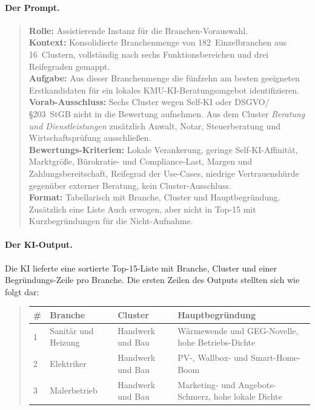 \documentclass[a4paper,11pt]{article}
\begin{document}
\paragraph{Der Prompt.}
\begin{quote}
\textbf{Rolle:} Assistierende Instanz für die Branchen-Vorauswahl.\\
\textbf{Kontext:} Konsolidierte Branchenmenge von 182~Einzelbranchen aus
16~Clustern, vollständig nach sechs Funktionsbereichen und drei
Reifegraden gemappt.\\
\textbf{Aufgabe:} Aus dieser Branchenmenge die fünfzehn am besten
geeigneten Erstkandidaten für ein lokales KMU-KI-Beratungsangebot
identifizieren.\\
\textbf{Vorab-Ausschluss:} Sechs Cluster wegen Self-KI oder
DSGVO/§203~StGB nicht in die Bewertung aufnehmen. Aus dem Cluster
\emph{Beratung und Dienstleistungen} zusätzlich Anwalt, Notar,
Steuerberatung und Wirtschaftsprüfung ausschließen.\\
\textbf{Bewertungs-Kriterien:} Lokale Verankerung, geringe
Self-KI-Affinität, Marktgröße, Bürokratie- und Compliance-Last, Margen
und Zahlungsbereitschaft, Reifegrad der Use-Cases, niedrige
Vertrauenshürde gegenüber externer Beratung, kein Cluster-Ausschluss.\\
\textbf{Format:} Tabellarisch mit Branche, Cluster und Hauptbegründung.
Zusätzlich eine Liste \glqq Auch erwogen, aber nicht in Top-15\grqq{}
mit Kurzbegründungen für die Nicht-Aufnahme.
\end{quote}

\paragraph{Der KI-Output.}
Die KI lieferte eine sortierte Top-15-Liste mit Branche, Cluster und
einer Begründungs-Zeile pro Branche. Die ersten Zeilen des Outputs
stellten sich wie folgt dar:

\begin{quote}\small
\begin{tabular}{p{0.4cm}p{3.2cm}p{2.7cm}p{7.5cm}}
\toprule
\textbf{\#} & \textbf{Branche} & \textbf{Cluster} & \textbf{Hauptbegründung} \\
\midrule
1 & Sanitär und Heizung & Handwerk und Bau & Wärmewende und GEG-Novelle, hohe Betriebs-Dichte \\
2 & Elektriker & Handwerk und Bau & PV-, Wallbox- und Smart-Home-Boom \\
3 & Malerbetrieb & Handwerk und Bau & Marketing- und Angebots-Schmerz, hohe lokale Dichte \\
\bottomrule
\end{tabular}
\end{quote}
\end{document}
